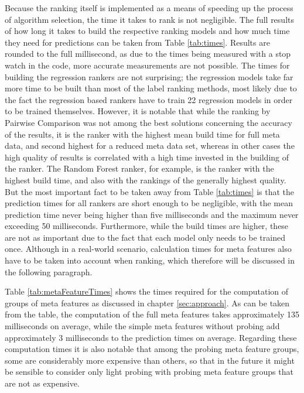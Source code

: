 Because the ranking itself is implemented as a means of speeding up the process of algorithm selection, the time it takes to rank is not negligible. The full results of how long it takes to build the respective ranking models and how much time they need for predictions can be taken from Table \ref{tab:times}. Results are rounded to the full millisecond, as due to the times being measured with a stop watch in the code, more accurate measurements are not possible. The times for building the regression rankers are not surprising; the regression models take far more time to be built than most of the label ranking methods, most likely due to the fact the regression based rankers have to train 22 regression models in order to be trained themselves. However, it is notable that while the ranking by Pairwise Comparison was not among the best solutions concerning the accuracy of the results, it is the ranker with the highest mean build time for full meta data, and second highest for a reduced meta data set, whereas in other cases the high quality of results is correlated with a high time invested in the building of the ranker. The Random Forest ranker, for example, is the ranker with the highest build time, and also with the rankings of the generally highest quality. But the most important fact to be taken away from Table \ref{tab:times} is that the prediction times for all rankers are short enough to be negligible, with the mean prediction time never being higher than five milliseconds and the maximum never exceeding 50 milliseconds. Furthermore, while the build times are higher, these are not as important due to the fact that each model only needs to be trained once. Although in a real-world scenario, calculation times for meta features also have to be taken into account when ranking, which therefore will be discussed in the following paragraph.



Table \ref{tab:metaFeatureTimes} shows the times required for the computation of groups of meta features as discussed in chapter \ref{sec:approach}. As can be taken from the table, the computation of the full meta features takes approximately 135 milliseconds on average, while the simple meta features without probing add approximately 3 milliseconds to the prediction times on average. Regarding these computation times it is also notable that among the probing meta feature groups, some are considerably more expensive than others, so that in the future it might be sensible to consider only light probing with probing meta feature groups that are not as expensive.

